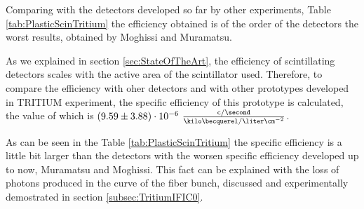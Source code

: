 Comparing with the detectors developed so far by other experiments, Table \ref{tab:PlasticScinTritium} the efficiency obtained is of the order of the detectors the worst results, obtained by Moghissi and Muramatsu. 

As we explained in section \ref{sec:StateOfTheArt}, the efficiency of scintillating detectors scales with the active area of the scintillator used. Therefore, to compare the efficiency with oher detectors and with other prototypes developed in TRITIUM experiment, the specific efficiency of this prototype is calculated, the value of which is $(9.59 \pm 3.88)\cdot{} 10^{-6}~ \frac{\text{c}/\second}{\kilo\becquerel/\liter\cm^{-2}}$.

As can be seen in the Table \ref{tab:PlasticScinTritium} the specific efficiency is a little bit larger than the detectors with the worsen specific efficiency developed up to now, Muramatsu and Moghissi. This fact can be explained with the loss of photons produced in the curve of the fiber bunch, discussed and experimentally demostrated in section \ref{subsec:TritiumIFIC0}.


